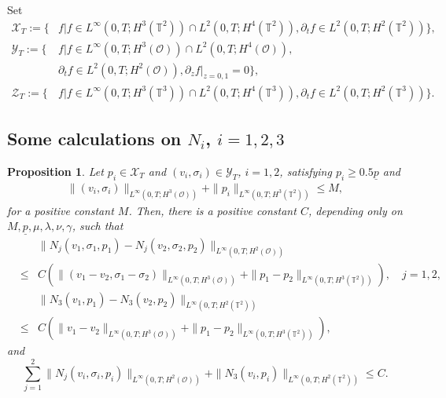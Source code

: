 \documentclass[12pt,reqno]{amsart}
\numberwithin{equation}{section}
\newtheorem{proposition}[theorem]{Proposition}
\begin{document}
Set
\begin{align*}
\mathscr{X}_{T}:=\big\{&f|f\in L^\infty(0,T; H^3(\mathbb T^2))\cap  L^2(0,T; H^4(\mathbb T^2)),\partial_tf\in L^2(0,T;H^2(\mathbb T^2))\big\},\\
\mathscr{Y}_T:=\big\{&f|f\in L^\infty(0,T; H^3(\mathcal O))\cap  L^2(0,T; H^4(\mathcal O)),\\
&\partial_tf\in L^2(0,T;H^2(\mathcal O)),\partial_zf|_{z=0,1}=0\big\},\\
\mathscr{Z}_T:=\big\{&f|f\in  L^\infty(0,T; H^3(\mathbb T^3))\cap L^2(0,T; H^4(\mathbb T^3)),\partial_tf\in L^2(0,T;H^2(\mathbb T^3))\big\}.
\end{align*}

\subsection{Some calculations on $N_i$, $i=1,2,3$}
\begin{proposition}
  \label{PROPA1-1}
   Let $p_i\in\mathscr X_T$ and $(v_i, \sigma_i)\in\mathscr Y_T$, $i=1,2$, satisfying $p_i\geq0.5\underline p$ and
   \begin{eqnarray*}
   \|(v_i,\sigma_i)\|_{L^\infty(0,T; H^3(\mathcal O))}+\|p_i\|_{L^\infty(0,T;H^3(\mathbb T^2))}\leq M,
   \end{eqnarray*}
   for a positive constant $M$. Then, there is a positive constant $C$, depending only on $M, \underline p, \mu, \lambda, \nu, \gamma$, such that
   \begin{eqnarray*}
     &&\|N_j(v_1,\sigma_1,p_1)-N_j(v_2,\sigma_2,p_2)\|_{L^\infty(0,T; H^2(\mathcal O))}\\
     &\leq&C\left(\|(v_1-v_2,\sigma_1-\sigma_2)\|_{L^\infty(0,T;H^3(\mathcal O))}+\|p_1-p_2\|_{L^\infty(0,T;H^3(\mathbb T^2))}\right),\quad j=1,2,\\
     &&\|N_3(v_1,p_1)-N_3(v_2,p_2)\|_{L^\infty(0,T; H^2(\mathbb T^2))}\\
     &\leq&C\left(\|v_1-v_2\|_{L^\infty(0,T;H^3(\mathcal O))}+\|p_1-p_2\|_{L^\infty(0,T;H^3(\mathbb T^2))}\right),
   \end{eqnarray*}
   and
   $$
   \sum_{j=1}^2\|N_j(v_i,\sigma_i,p_i)\|_{L^\infty(0,T; H^2(\mathcal O))}+\|N_3(v_i,p_i)\|_{L^\infty(0,T; H^2(\mathbb T^2))}\leq C.
   $$
\end{proposition}
\end{document}
